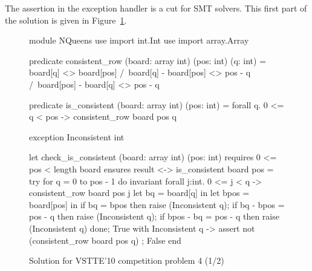 The assertion in the exception handler is a cut for SMT solvers.
This first part of the solution is given in Figure~\ref{fig:NQueens1}.
\begin{figure}
  \centering
\begin{whycode}
module NQueens
  use import int.Int
  use import array.Array

  predicate consistent_row (board: array int) (pos: int) (q: int) =
    board[q] <> board[pos] /\
    board[q] - board[pos] <> pos - q /\
    board[pos] - board[q] <> pos - q

  predicate is_consistent (board: array int) (pos: int) =
    forall q. 0 <= q < pos -> consistent_row board pos q

  exception Inconsistent int

  let check_is_consistent (board: array int) (pos: int)
    requires { 0 <= pos < length board }
    ensures  { result <-> is_consistent board pos }
  = try
      for q = 0 to pos - 1 do
        invariant {
          forall j:int. 0 <= j < q -> consistent_row board pos j
        }
        let bq   = board[q]   in
        let bpos = board[pos] in
        if bq        = bpos    then raise (Inconsistent q);
        if bq - bpos = pos - q then raise (Inconsistent q);
        if bpos - bq = pos - q then raise (Inconsistent q)
      done;
      True
    with Inconsistent q ->
      assert { not (consistent_row board pos q) };
      False
    end
\end{whycode}
\vspace*{-1em}%
  \caption{Solution for VSTTE'10 competition problem 4 (1/2)}
  \label{fig:NQueens1}
\end{figure}


